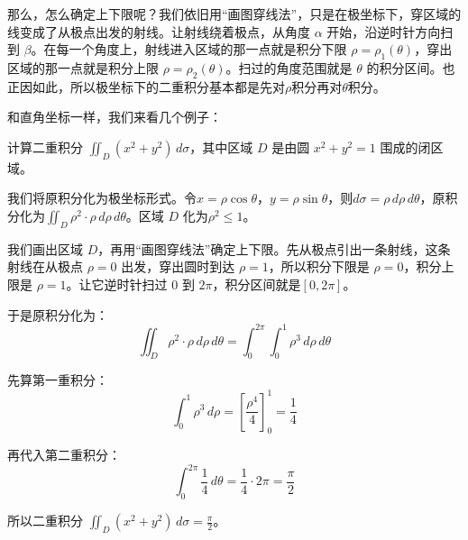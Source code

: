 那么，怎么确定上下限呢？我们依旧用“画图穿线法”，只是在极坐标下，穿区域的线变成了从极点出发的射线。让射线绕着极点，从角度 \(\alpha\) 开始，沿逆时针方向扫到 \(\beta\)。在每一个角度上，射线进入区域的那一点就是积分下限 \(\rho=\rho_1(\theta)\)，穿出区域的那一点就是积分上限 \(\rho=\rho_2(\theta)\)。扫过的角度范围就是 \(\theta\) 的积分区间。也正因如此，所以极坐标下的二重积分基本都是先对$\rho$积分再对$\theta$积分。

和直角坐标一样，我们来看几个例子：

\begin{myexample}
    计算二重积分 \(\iint_D (x^2+y^2)\,d\sigma\)，其中区域 \(D\) 是由圆 \(x^2+y^2=1\) 围成的闭区域。

    我们将原积分化为极坐标形式。令$x = \rho\cos\theta$，$y = \rho\sin\theta$，则$d\sigma = \rho\,d\rho\,d\theta$，原积分化为$\iint_D \rho^2 \cdot \rho\,d\rho\,d\theta$。区域 \(D\) 化为$\rho^2\le1$。

    我们画出区域 \(D\)，再用“画图穿线法”确定上下限。先从极点引出一条射线，这条射线在从极点 \(\rho=0\) 出发，穿出圆时到达 \(\rho=1\)，所以积分下限是 \(\rho=0\)，积分上限是 \(\rho=1\)。让它逆时针扫过 \(0\) 到 \(2\pi\)，积分区间就是$[0,2\pi]$。

    \begin{center}
    \end{center}

    于是原积分化为：
    \[
\iint_D \rho^2 \cdot \rho\,d\rho\,d\theta = \int_{0}^{2\pi} \int_{0}^{1} \rho^3\,d\rho\,d\theta
    \]

    先算第一重积分：
    \[
    \int_{0}^{1} \rho^3\,d\rho = \left[ \frac{\rho^4}{4} \right]_{0}^{1} = \frac{1}{4}
    \]

    再代入第二重积分：
    \[
    \int_{0}^{2\pi} \frac{1}{4}\,d\theta = \frac{1}{4} \cdot 2\pi = \frac{\pi}{2}
    \]

    所以二重积分 \(\iint_D (x^2+y^2)\,d\sigma=\frac{\pi}{2}\)。
\end{myexample}

